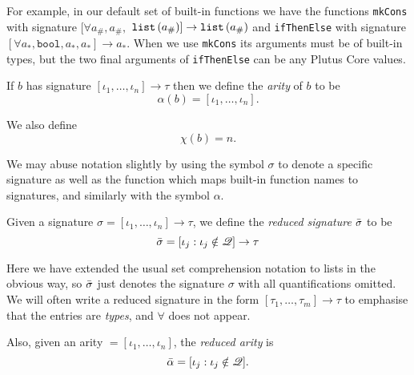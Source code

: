 
\noindent For example, in our default set of built-in functions we have the
functions \texttt{mkCons} with signature $[\forall a_\#, a_\#,$  %
  $\mathtt{list}\,\mathtt{(}a_\#\mathtt{)}] \rightarrow \mathtt{list}\,\mathtt{(}a_\#\mathtt{)}$ and \texttt{ifThenElse} with signature
$[\forall a_*, \mathtt{bool}, a_*, a_*] \rightarrow a_*$.  When we use
\texttt{mkCons} its arguments must be of built-in types, but the two final
arguments of \texttt{ifThenElse} can be any Plutus Core values.

\smallskip
\noindent If $b$ has signature $[\iota_1, \ldots, \iota_n] \rightarrow \tau$ then we define
the \textit{arity}  of $b$ to be
$$
\alpha(b) = [\iota_1, \ldots, \iota_n].
$$%

\noindent We also define
$$
  \chi(b) = n.
$$%

\noindent We may abuse notation slightly by using the symbol $\sigma$ to denote
a specific signature as well as the function which maps built-in function names
to signatures, and similarly with the symbol $\alpha$.

\medskip
\noindent Given a signature
$\sigma = [\iota_1, \ldots, \iota_n] \rightarrow \tau$,
we define the \textit{reduced signature} $\bar{\sigma}$ to be
$$
\bar{\sigma} = [\iota_j : \iota_j \notin \mathscr{Q}] \rightarrow \tau
$$%

\noindent Here we have extended the usual set comprehension notation to lists in the
obvious way, so $\bar{\sigma}$ just denotes the signature $\sigma$ with all
quantifications omitted. We will often write a reduced signature in the form
$[\tau_1, \ldots, \tau_m] \rightarrow \tau$ to emphasise that the entries are
\textit{types}, and $\mathbf{\forall}$ does not appear.

\medskip
\noindent Also, given an arity $= [\iota_1, \ldots, \iota_n]$, the \textit{reduced
  arity} is
$$
\bar{\alpha} = [\iota_j : \iota_j \notin \mathscr{Q}].
$$%

